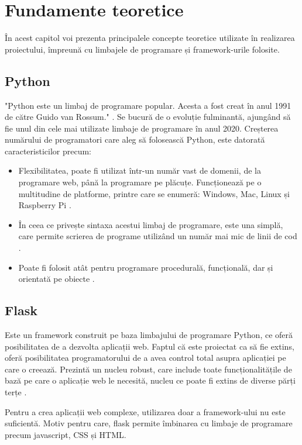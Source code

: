 \chapter{Fundamente teoretice}\label{ch:3fundamenteTeoretice}

	În acest capitol voi prezenta principalele concepte teoretice utilizate în realizarea proiectului, împreună cu limbajele de programare și framework-urile folosite. 

\section{Python}

	"Python este un limbaj de programare popular. Acesta a fost creat în anul 1991 de către Guido van Rossum." \cite{python}. Se bucură de o evoluție fulminantă, ajungând să fie unul din cele mai utilizate limbaje de programare în anul 2020. Creșterea numărului de programatori care aleg să folosească Python, este datorată  caracteristicilor precum: 
	\begin{itemize}
	\setlength{\itemindent}{2em}
	\itemsep0em
	\item Flexibilitatea, poate fi utilizat într-un număr vast de domenii, de la programare web, până la programare pe plăcuțe. Funcționează pe o multitudine de platforme, printre care se enumeră: Windows, Mac, Linux și Raspberry Pi \cite{python}. 
	\item În ceea ce privește sintaxa acestui limbaj de programare, este una simplă, care permite scrierea de programe utilizând un număr mai mic de linii de cod \cite{python}. 
	\item Poate fi folosit atât pentru programare procedurală, funcțională, dar și orientată pe obiecte \cite{python}.
	\end{itemize}

\section{Flask}

	Este un framework construit pe baza limbajului de programare Python, ce oferă posibilitatea de a dezvolta aplicații web. Faptul că este proiectat ca să fie extins, oferă posibilitatea programatorului de a avea control total asupra aplicației pe care o creează. Prezintă un nucleu robust, care include toate funcționalitățile de bază pe care o aplicație web le necesită, nucleu ce poate fi extins de diverse părți terțe \cite{flask}.

	Pentru a crea aplicații web complexe, utilizarea doar a framework-ului nu este suficientă. Motiv pentru care, flask permite îmbinarea cu limbaje de programare precum javascript, CSS și HTML.

